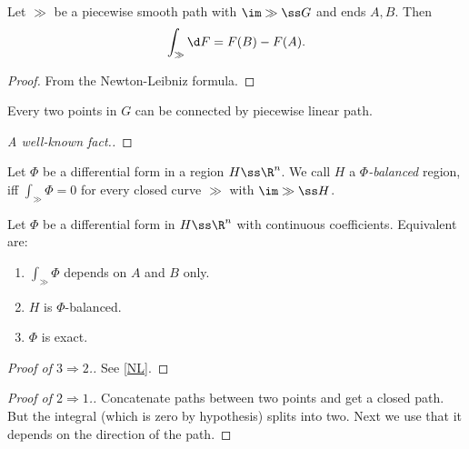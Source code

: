 \documentclass[a4paper, 12pt]{article}
\begin{document}
\begin{lemma}
  Let $\gg$ be a piecewise smooth path with $\im \gg \ss G$ and ends $A, B$. Then
  \begin{equation}
    \label{NL}
    \int_\gg \d F = F(B) - F(A).
  \end{equation}
\end{lemma}

\begin{proof}
  From the Newton-Leibniz formula.
\end{proof}

\begin{theorem}
  Every two points in $G$ can be connected by piecewise linear path.  
\end{theorem}

\begin{proof}[A well-known fact.]
\end{proof}

\begin{definition}
  Let $\Phi$ be a differential form in a region $H \ss \R^n$.
  We call $H$ a \emph{$\Phi$-balanced} region, iff
  $ \int_\gg \Phi = 0 $
  for every closed curve $\gg$ with $\im \gg \ss H$.
\end{definition}

\begin{theorem}
  Let $\Phi$ be a differential form in $H \ss \R^n$ with continuous coefficients. Equivalent are:
  \begin{enumerate}
    \item $\int_\gg \Phi$ depends on $A$ and $B$ only.
    \item $H$ is $\Phi$-balanced.
    \item $\Phi$ is exact. 
  \end{enumerate} 
\end{theorem}

\begin{proof}[Proof of $3 \Rightarrow 2$.]
  See \eqref{NL}.
\end{proof}

\begin{proof}[Proof of $2 \Rightarrow 1$.]
  Concatenate paths between two points and get a closed path. But the integral (which is zero by hypothesis) splits into two. Next we use that it depends on the direction of the path.
\end{proof}
\end{document}
